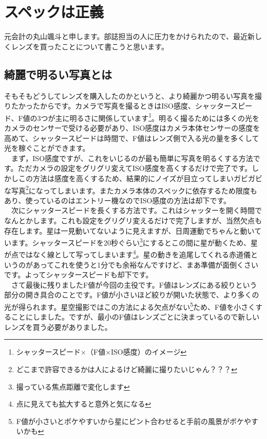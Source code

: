 \documentclass[supernova_2023]{subfiles}
\begin{document}
\chapter{スペックは正義}
元会計の丸山颯斗と申します。部誌担当の人に圧力をかけられたので、最近新しくレンズを買ったことについて書こうと思います。\\
\section{綺麗で明るい写真とは}
そもそもどうしてレンズを購入したのかというと、より綺麗かつ明るい写真を撮りたかったからです。カメラで写真を撮るときはISO感度、シャッタースピード、F値の3つが主に明るさに関係しています\footnote{シャッタースピード×（F値×ISO感度）のイメージ}。明るく撮るためには多くの光をカメラのセンサーで受ける必要があり、ISO感度はカメラ本体センサーの感度を高めて、シャッタースピードは時間で、F値はレンズ側で入る光の量を多くして光を稼ぐことができます。\\
　まず，ISO感度ですが、これをいじるのが最も簡単に写真を明るくする方法です。ただカメラの設定をグリグリ変えてISO感度を高くするだけで完了です。しかしこの方法は感度を高くするため、結果的にノイズが目立ってしまいガビガビな写真\footnote{どこまで許容できるかは人によるけど綺麗に撮りたいじゃん？？？}になってしまいます。またカメラ本体のスペックに依存するため限度もあり、使っているのはエントリー機なのでISO感度の方法は却下です。\\
　次にシャッタースピードを長くする方法です。これはシャッターを開く時間でなんとかします。これも設定をグリグリ変えるだけで完了しますが、当然欠点も存在します。星は一見動いてないように見えますが、日周運動でちゃんと動いています。シャッタースピードを20秒ぐらい\footnote{撮っている焦点距離で変化します}にするとこの間に星が動くため、星が点ではなく線として写ってしまいます\footnote{点に見えても拡大すると意外と気になる}。星の動きを追尾してくれる赤道儀というのがあってこれを使うと1分でも余裕なんですけど、まあ準備が面倒くさいです。よってシャッタースピードも却下です。\\
　さて最後に残りましたF値が今回の主役です。F値はレンズにある絞りという部分の開き具合のことです。F値が小さいほど絞りが開いた状態で、より多くの光が得られます。星空撮影ではこの方法による欠点がない\footnote{F値が小さいとボケやすいから星にピント合わせると手前の風景がボケやすいかも}ため、F値を小さくすることにしました。ですが、最小のF値はレンズごとに決まっているので新しいレンズを買う必要がありました。
\end{document}
